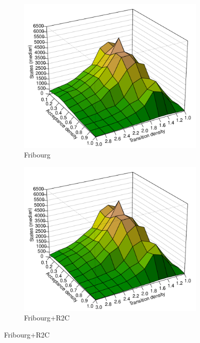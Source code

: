 \begin{figure}[ht]
\centering
  \hfill
  \begin{subfigure}[t]{\perspwidth\textwidth}
  \centering
  \includegraphics[width=\textwidth]{figures/r/internal/goal/s.median.Fribourg.pdf}
  \caption{Fribourg}
  \end{subfigure}
  \hfill
  \begin{subfigure}[t]{\perspwidth\textwidth}
  \centering
  \includegraphics[width=\textwidth]{figures/r/internal/goal/s.median.Fribourg+R2C.pdf}
  \caption{Fribourg+R2C}
  \end{subfigure}
  \hfill


\end{figure}
